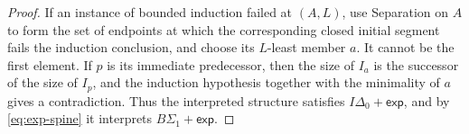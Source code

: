 \documentclass[10pt,a4paper]{amsart}
\newcommand{\BS}[1]{B\Sigma_{#1}}
\newcommand{\expax}{\mathsf{exp}}
\begin{document}
\begin{proof}
  If an instance of bounded induction failed at \((A,L)\), use Separation on \(A\) to form the set of endpoints at which the corresponding closed initial segment fails the induction conclusion, and choose its \(L\)-least member \(a\). It cannot be the first element. If \(p\) is its immediate predecessor, then the size of \(I_a\) is the successor of the size of \(I_p\), and the induction hypothesis together with the minimality of \(a\) gives a contradiction. Thus the interpreted structure satisfies \(I\Delta_0+\expax\), and by \eqref{eq:exp-spine} it interprets \(\BS1+\expax\).
\end{proof}
\end{document}
